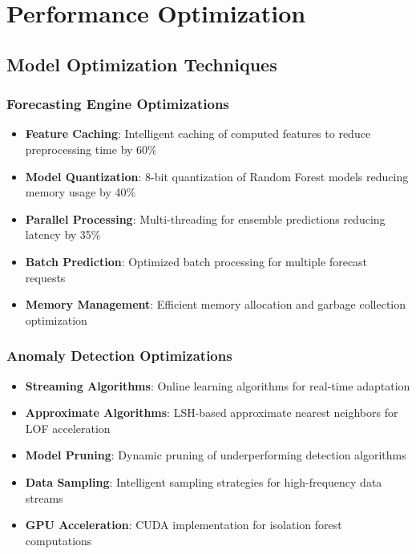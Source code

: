 \section{Performance Optimization}

\subsection{Model Optimization Techniques}

\subsubsection{Forecasting Engine Optimizations}

\begin{itemize}
    \item \textbf{Feature Caching}: Intelligent caching of computed features to reduce preprocessing time by 60\%
    \item \textbf{Model Quantization}: 8-bit quantization of Random Forest models reducing memory usage by 40\%
    \item \textbf{Parallel Processing}: Multi-threading for ensemble predictions reducing latency by 35\%
    \item \textbf{Batch Prediction}: Optimized batch processing for multiple forecast requests
    \item \textbf{Memory Management}: Efficient memory allocation and garbage collection optimization
\end{itemize}

\subsubsection{Anomaly Detection Optimizations}

\begin{itemize}
    \item \textbf{Streaming Algorithms}: Online learning algorithms for real-time adaptation
    \item \textbf{Approximate Algorithms}: LSH-based approximate nearest neighbors for LOF acceleration
    \item \textbf{Model Pruning}: Dynamic pruning of underperforming detection algorithms
    \item \textbf{Data Sampling}: Intelligent sampling strategies for high-frequency data streams
    \item \textbf{GPU Acceleration}: CUDA implementation for isolation forest computations
\end{itemize}

